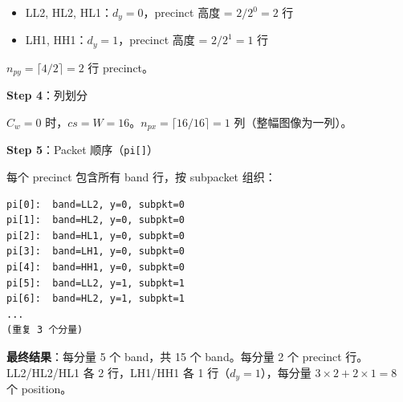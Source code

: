 \begin{examplebox}[title={例 1：4:4:4 图像的 IDS 构建}]
\begin{itemize}
  \item LL2, HL2, HL1：$d_y = 0$，precinct 高度 = $2 / 2^0 = 2$ 行
  \item LH1, HH1：$d_y = 1$，precinct 高度 = $2 / 2^1 = 1$ 行
\end{itemize}

$n_{py} = \lceil 4 / 2 \rceil = 2$ 行 precinct。

\textbf{Step 4}：列划分

$C_w = 0$ 时，$\mathit{cs} = W = 16$。$n_{px} = \lceil 16 / 16 \rceil = 1$ 列（整幅图像为一列）。

\textbf{Step 5}：Packet 顺序（\texttt{pi[]}）

每个 precinct 包含所有 band 行，按 subpacket 组织：

\begin{lstlisting}[numbers=none]
pi[0]:  band=LL2, y=0, subpkt=0
pi[1]:  band=HL2, y=0, subpkt=0
pi[2]:  band=HL1, y=0, subpkt=0
pi[3]:  band=LH1, y=0, subpkt=0
pi[4]:  band=HH1, y=0, subpkt=0
pi[5]:  band=LL2, y=1, subpkt=1
pi[6]:  band=HL2, y=1, subpkt=1
...
(重复 3 个分量)
\end{lstlisting}

\medskip
\textbf{最终结果}：每分量 5 个 band，共 15 个 band。每分量 2 个 precinct 行。LL2/HL2/HL1 各 2 行，LH1/HH1 各 1 行（$d_y=1$），每分量 $3\times2 + 2\times1 = 8$ 个 position。
\end{examplebox}

